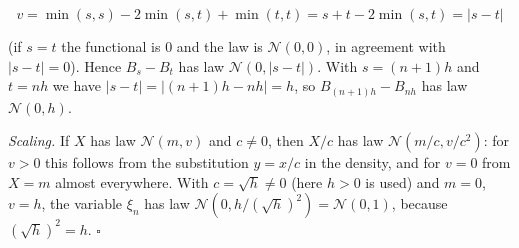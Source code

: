 \documentclass[11pt,a4paper]{article}
\begin{document}
\[v=\min(s,s)-2\min(s,t)+\min(t,t)=s+t-2\min(s,t)=|s-t|\]


(if \(s=t\) the functional is \(0\) and the law is \(\mathcal N(0,0)\), in agreement with \(|s-t|=0\)). Hence \(B_s-B_t\) has law \(\mathcal N(0,|s-t|)\). With \(s=(n+1)h\) and \(t=nh\) we have \(|s-t|=|(n+1)h-nh|=h\), so \(B_{(n+1)h}-B_{nh}\) has law \(\mathcal N(0,h)\).




\emph{Scaling.} If \(X\) has law \(\mathcal N(m,v)\) and \(c\ne0\), then \(X/c\) has law \(\mathcal N(m/c,v/c^2)\): for \(v>0\) this follows from the substitution \(y=x/c\) in the density, and for \(v=0\) from \(X=m\) almost everywhere. With \(c=\sqrt h\ne0\) (here \(h>0\) is used) and \(m=0\), \(v=h\), the variable \(\xi_n\) has law \(\mathcal N(0,h/(\sqrt h)^2)=\mathcal N(0,1)\), because \((\sqrt h)^2=h\). \(\square\)
\end{document}
